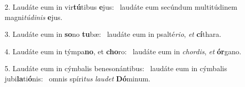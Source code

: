 2. Laudáte eum in vir\textbf{tú}tibus \textbf{e}jus: \ast\  laudáte eum secúndum multitúdinem magni\textit{tú}\textit{di}\textit{nis} \textbf{e}jus.\

3. Laudáte eum in \textbf{so}no \textbf{tu}bæ: \ast\  laudáte eum in psalté\textit{ri}\textit{o}, \textit{et} \textbf{cí}thara.\

4. Laudáte eum in týmpa\textbf{no}, et \textbf{cho}ro: \ast\  laudáte eum in \textit{chor}\textit{dis}, \textit{et} \textbf{ór}gano.\

5. Laudáte eum in cýmbalis benesonántibus: \dag\  laudáte eum in cýmbalis jubi\textbf{la}ti\textbf{ó}nis: \ast\  omnis spíri\textit{tus} \textit{lau}\textit{det} \textbf{Dó}minum.\

